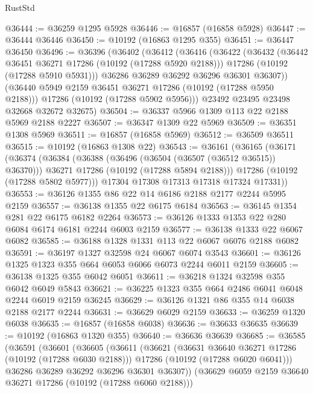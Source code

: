 \begin{lexlean}{RustStd}
\begin{coremodule}
@36444 := @36259 @1295 @5928
@36446 := @16857 (@16858 @5928)
@36447 := @36444 @36446
@36450 := @10192 (@16863 @1295 @355)
@36451 := @36447 @36450
@36496 := @36396
    (@36402
      (@36412
        (@36416
          (@36422
            (@36432
              (@36442 @36451 @36271 @17286 (@10192 (@17288 @5920 @2188)))
              @17286
              (@10192 (@17288 @5910 @5931)))
            @36286
            @36289
            @36292
            @36296
            @36301
            @36307))
        (@36440 @5949 @2159 @36451 @36271 @17286 (@10192 (@17288 @5950 @2188)))
        @17286
        (@10192 (@17288 @5902 @5956)))
      @23492
      @23495
      @23498
      @32668
      @32672
      @32675)
@36504 := @36337 @5966 @1309 @113 @22 @2188 @5969 @2188 @2227
@36507 := @36347 @1309 @22 @5969
@36509 := @36351 @1308 @5969
@36511 := @16857 (@16858 @5969)
@36512 := @36509 @36511
@36515 := @10192 (@16863 @1308 @22)
@36543 := @36161
    (@36165
      (@36171
        (@36374
          (@36384
            (@36388 (@36496 (@36504 (@36507 (@36512 @36515)) @36370)))
            @36271
            @17286
            (@10192 (@17288 @5894 @2188)))
          @17286
          (@10192 (@17288 @5802 @5977)))
        @17304
        @17308
        @17313
        @17318
        @17324
        @17331))
@36553 := @36126 @1355 @86 @22 @14 @6186 @2188 @2177 @2244 @5995 @2159
@36557 := @36138 @1355 @22 @6175 @6184
@36563 := @36145 @1354 @281 @22 @6175 @6182 @2264
@36573 := @36126 @1333 @1353 @22 @280 @6084 @6174 @6181 @2244 @6003 @2159
@36577 := @36138 @1333 @22 @6067 @6082
@36585 := @36188 @1328 @1331 @113 @22 @6067 @6076 @2188 @6082
@36591 := @36197 @1327 @32598 @24 @6067 @6074 @3543
@36601 := @36126 @1325 @1323 @355 @664 @6053 @6066 @6073 @2244 @6011 @2159
@36605 := @36138 @1325 @355 @6042 @6051
@36611 := @36218 @1324 @32598 @355 @6042 @6049 @5843
@36621 := @36225 @1323 @355 @664 @2486 @6041 @6048 @2244 @6019 @2159 @36245
@36629 := @36126 @1321 @86 @355 @14 @6038 @2188 @2177 @2244
@36631 := @36629 @6029 @2159
@36633 := @36259 @1320 @6038
@36635 := @16857 (@16858 @6038)
@36636 := @36633 @36635
@36639 := @10192 (@16863 @1320 @355)
@36640 := @36636 @36639
@36685 := @36585
    (@36591
      (@36601
        (@36605
          (@36611
            (@36621
              (@36631 @36640 @36271 @17286 (@10192 (@17288 @6030 @2188)))
              @17286
              (@10192 (@17288 @6020 @6041)))
            @36286
            @36289
            @36292
            @36296
            @36301
            @36307))
        (@36629 @6059 @2159 @36640 @36271 @17286 (@10192 (@17288 @6060 @2188)))

\end{coremodule}
\end{lexlean}
